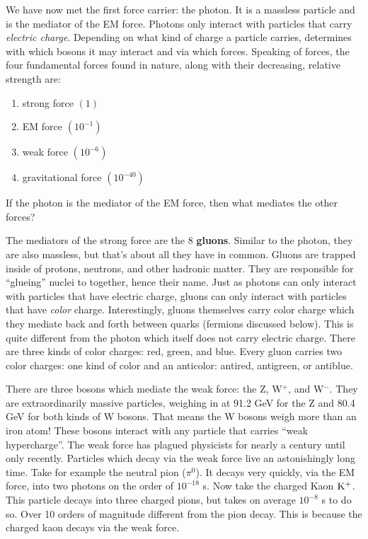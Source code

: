 We have now met the first force carrier: the photon.
It is a massless particle and is the mediator of the EM force. 
Photons only interact with particles that carry \emph{electric charge}.
Depending on what kind of charge a particle carries, determines with which bosons it may interact and via which forces.
Speaking of forces, the four fundamental forces found in nature, along with their decreasing, relative strength are: 
\begin{enumerate}
    \item strong force $(1)$
    \item EM force $(10^{-1})$
    \item weak force $(10^{-6})$
    \item gravitational force $(10^{-40})$
\end{enumerate}
If the photon is the mediator of the EM force, then what mediates the other forces?

The mediators of the strong force are the 8 {\bf gluons}. 
Similar to the photon, they are also massless, but that's about all they have in common. 
Gluons are trapped inside of protons, neutrons, and other hadronic matter. 
They are responsible for ``glueing'' nuclei to together, hence their name.
Just as photons can only interact with particles that have electric charge, gluons can only interact with particles that have \emph{color} charge.
Interestingly, gluons themselves carry color charge which they mediate back and forth between quarks (fermions discussed below).
This is quite different from the photon which itself does not carry electric charge. 
There are three kinds of color charges: red, green, and blue.
Every gluon carries two color charges:
one kind of color and an anticolor: antired, antigreen, or antiblue.

There are three bosons which mediate the weak force: the Z, W$^+$, and W$^-$.
They are extraordinarily massive particles, weighing in at 91.2 GeV for the Z and 80.4 GeV for both kinds of W bosons. 
That means the W bosons weigh more than an iron atom! These bosons interact with any particle that carries ``weak hypercharge''.
The weak force has plagued physicists for nearly a century until only recently.
Particles which decay via the weak force live an astonishingly long time. 
Take for example the neutral pion ($\pi^0$). 
It decays very quickly, via the EM force, into two photons on the order of $10^{-18}$ s.
Now take the charged Kaon ${\rm K^+}$. 
This particle decays into three charged pions, but takes on average $10^{-8}$ s to do so.
Over 10 orders of magnitude different from the pion decay.
This is because the charged kaon decays via the weak force.

